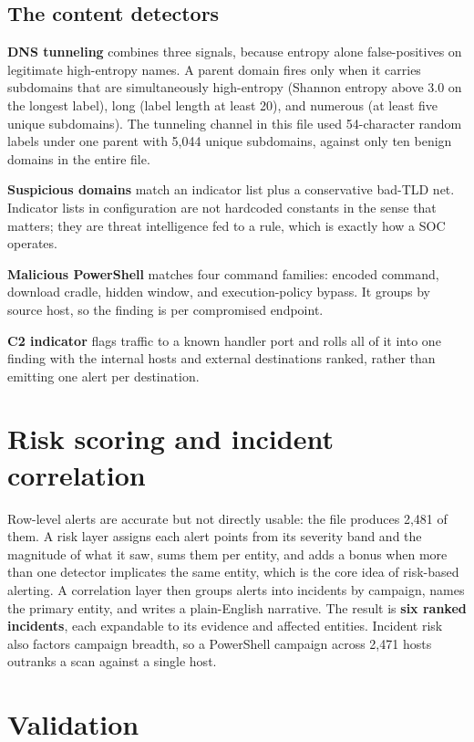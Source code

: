 \documentclass[11pt,a4paper]{article}
\begin{document}
\subsection{The content detectors}

\textbf{DNS tunneling} combines three signals, because entropy alone
false-positives on legitimate high-entropy names. A parent domain fires only when
it carries subdomains that are simultaneously high-entropy (Shannon entropy above
3.0 on the longest label), long (label length at least 20), and numerous (at
least five unique subdomains). The tunneling channel in this file used
54-character random labels under one parent with 5,044 unique subdomains, against
only ten benign domains in the entire file.

\textbf{Suspicious domains} match an indicator list plus a conservative bad-TLD
net. Indicator lists in configuration are not hardcoded constants in the sense
that matters; they are threat intelligence fed to a rule, which is exactly how a
SOC operates.

\textbf{Malicious PowerShell} matches four command families: encoded command,
download cradle, hidden window, and execution-policy bypass. It groups by source
host, so the finding is per compromised endpoint.

\textbf{C2 indicator} flags traffic to a known handler port and rolls all of it
into one finding with the internal hosts and external destinations ranked, rather
than emitting one alert per destination.

\section{Risk scoring and incident correlation}

Row-level alerts are accurate but not directly usable: the file produces 2,481 of
them. A risk layer assigns each alert points from its severity band and the
magnitude of what it saw, sums them per entity, and adds a bonus when more than
one detector implicates the same entity, which is the core idea of risk-based
alerting. A correlation layer then groups alerts into incidents by campaign,
names the primary entity, and writes a plain-English narrative. The result is
\textbf{six ranked incidents}, each expandable to its evidence and affected
entities. Incident risk also factors campaign breadth, so a PowerShell campaign
across 2,471 hosts outranks a scan against a single host.

\section{Validation}
\end{document}
